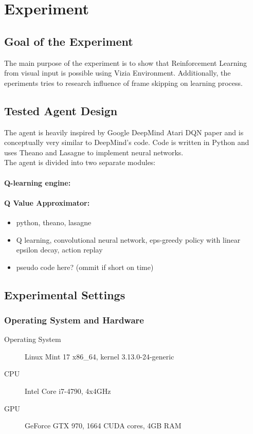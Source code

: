 \chapter{Experiment}

\section{Goal of the Experiment}
The main purpose of the experiment is to show that Reinforcement Learning from visual input is possible using Vizia Environment. 	
Additionally, the eperiments tries to research influence of frame skipping on learning process.

\section{Tested Agent Design}
	The agent is heavily inspired by Google DeepMind Atari DQN paper\cite{mnih-dqn-2015} and is conceptually very similar to DeepMind's code. Code is written in Python and uses Theano\cite{Bastien-Theano-2012}\cite{bergstra+al:2010-scipy} and Lasagne\cite{sander_dieleman_2015_27878} to implement neural networks.
	\\
	The agent is divided into two separate modules:

	\subsubsection{Q-learning engine:} 
	\subsubsection{Q Value Approximator:} 
	\begin{itemize}
		\item python, theano, lasagne
		\item Q learning, convolutional neural network, eps-greedy policy with linear epsilon decay, action replay
		\item pseudo code here? (ommit if short on time)
	\end{itemize}

\section{Experimental Settings} 

	\subsection{Operating System and Hardware}
	\begin{description}
		\item[Operating System] Linux Mint 17 x86\_64, kernel 3.13.0-24-generic
		\item[CPU] Intel Core i7-4790, 4x4GHz
		\item[GPU] GeForce GTX 970, 1664 CUDA cores, 4GB RAM
	\end{description}

